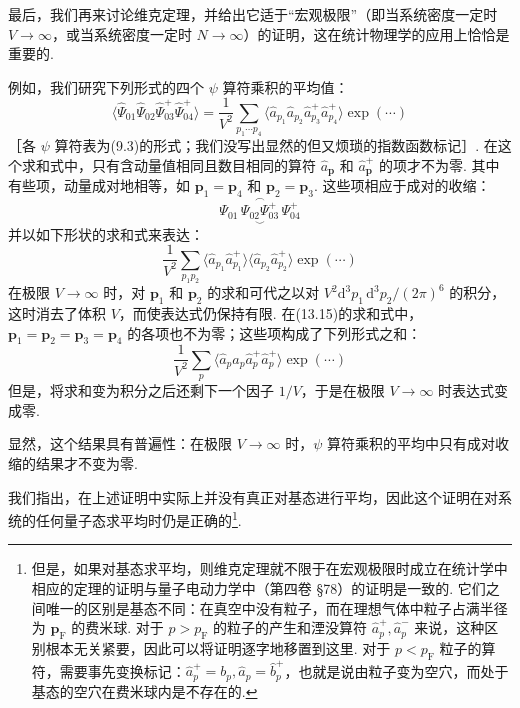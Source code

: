 最后，我们再来讨论维克定理，并给出它适于“宏观极限”（即当系统密度一定时 $V\to\infty$，或当系统密度一定时 $N\to\infty$）的证明，这在统计物理学的应用上恰恰是重要的.

例如，我们研究下列形式的四个 $\psi$ 算符乘积的平均值：
\begin{equation}
\big\langle\hat\Psi_{01}\hat\Psi_{02}\hat\Psi^{+}_{03}\hat\Psi^{+}_{04}\big\rangle=\frac{1}{V^2}\sum_{p_1\cdots p_4}\big\langle\hat a_{p_1}\hat a_{p_2}\hat a^{+}_{p_3}\hat a^{+}_{p_4}\big\rangle\exp(\cdots)
\end{equation}
［各 $\psi$ 算符表为(9.3)的形式；我们没写出显然的但又烦琐的指数函数标记］. 在这个求和式中，只有含动量值相同且数目相同的算符 $\hat a_{\bm p}$ 和 $\hat a^{+}_{\bm p}$ 的项才不为零. 其中有些项，动量成对地相等，如 $\bm p_1=\bm p_4$ 和 $\bm p_2=\bm p_3$. 这些项相应于成对的收缩：
\begin{equation*}
\underset{\smile}{\Psi_{01}\,\overset{\frown}{\Psi_{02}\Psi^{+}_{03}}\,\Psi^{+}_{04}}
\end{equation*}
并以如下形状的求和式来表达：
\begin{equation*}
\frac{1}{V^2}\sum_{p_1p_2}\big\langle\hat a_{p_1}\hat a^{+}_{p_1}\big\rangle\big\langle\hat a_{p_2}\hat a^{+}_{p_2}\big\rangle\exp(\cdots)
\end{equation*}
在极限 $V\to\infty$ 时，对 $\bm p_1$ 和 $\bm p_2$ 的求和可代之以对 $V^2\mathrm{d}^3p_1\,\mathrm{d}^3p_2/(2\pi)^6$ 的积分，这时消去了体积 $V$，而使表达式仍保持有限. 在(13.15)的求和式中，$\bm p_1=\bm p_2=\bm p_3=\bm p_4$ 的各项也不为零；这些项构成了下列形式之和：
\begin{equation*}
\frac{1}{V^2}\sum_{p}\big\langle\hat a_{p}\hat a_{p}\hat a^{+}_{p}\hat a^{+}_{p}\big\rangle\exp(\cdots)
\end{equation*}
但是，将求和变为积分之后还剩下一个因子 $1/V$，于是在极限 $V\to\infty$ 时表达式变成零.

显然，这个结果具有普遍性：在极限 $V\to\infty$ 时，$\psi$ 算符乘积的平均中只有成对收缩的结果才不变为零.

我们指出，在上述证明中实际上并没有真正对基态进行平均，因此这个证明在对系统的任何量子态求平均时仍是正确的\footnote{但是，如果对基态求平均，则维克定理就不限于在宏观极限时成立在统计学中相应的定理的证明与量子电动力学中（第四卷 §78）的证明是一致的. 它们之间唯一的区别是基态不同：在真空中没有粒子，而在理想气体中粒子占满半径为 $\bm p_{\mathrm F}$ 的费米球. 对于 $p>p_{\mathrm F}$ 的粒子的产生和湮没算符 $\hat a^{+}_{p},\hat a^{-}_{p}$ 来说，这种区别根本无关紧要，因此可以将证明逐字地移置到这里. 对于 $p<p_{\mathrm F}$ 粒子的算符，需要事先变换标记：$\hat a^{+}_{p}=b_{p},\hat a_{p}=\hat b^{+}_{p}$，也就是说由粒子变为空穴，而处于基态的空穴在费米球内是不存在的.}.
